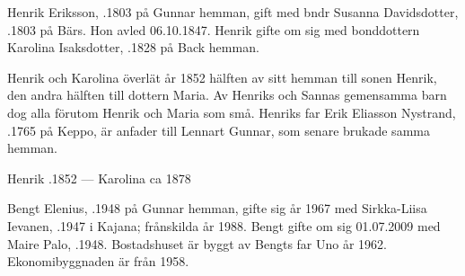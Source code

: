 %
Henrik Eriksson, .1803 på Gunnar hemman, gift med bndr Susanna Davidsdotter, .1803 på Bärs. Hon avled 06.10.1847. Henrik gifte om sig med bonddottern Karolina Isaksdotter, .1828 på Back hemman.
\begin{jhchildren}
  \item {}
  \item {}
  \item {}
  \item {}
  \item {}
  \item {}
  \item {}
  \item {}
  \item {}
\end{jhchildren}

Henrik och Karolina överlät år 1852 hälften av sitt hemman till sonen Henrik, den andra hälften till dottern Maria. Av Henriks och Sannas gemensamma barn dog alla förutom Henrik och Maria som små. Henriks far Erik Eliasson Nystrand, .1765 på Keppo, är anfader till Lennart Gunnar, som senare brukade samma hemman.

Henrik .1852  ---  Karolina \textdied ca 1878



%



%
Bengt Elenius, .1948 på Gunnar hemman, gifte sig år 1967 med Sirkka-Liisa Ievanen, .1947 i Kajana; frånskilda år 1988. Bengt gifte om sig 01.07.2009 med Maire Palo, .1948. Bostadshuset är byggt av Bengts far Uno år 1962. Ekonomibyggnaden är från 1958.
\begin{jhchildren}
  \item {}
  \item {}
  \item {}
\end{jhchildren}

